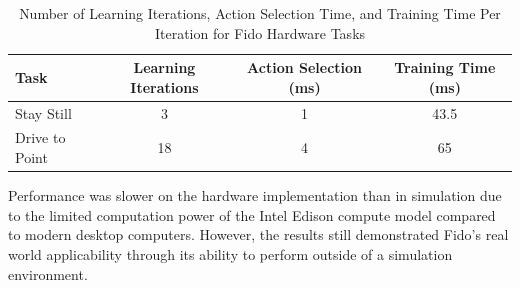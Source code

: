 \begin{table}[ht]
	\centering
	\begin{tabular}{@{}lccc@{}}
		\toprule
		Task             & Learning Iterations & Action Selection (ms) & Training Time (ms) \\ \midrule
		Stay Still       & 3                   & 1                    & 43.5                  \\
		Drive to Point   & 18                  & 4                     & 65                  \\
	\end{tabular}
	\caption{Number of Learning Iterations, Action Selection Time, and Training Time Per Iteration for Fido Hardware Tasks}
	\label{tab:data2}
\end{table}

Performance was slower on the hardware implementation than in simulation due to the limited computation power of the Intel Edison compute model compared to modern desktop computers.
However, the results still demonstrated Fido's real world applicability through its ability to perform outside of a simulation environment.
